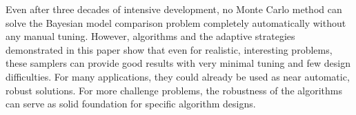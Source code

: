 Even after three decades of intensive development, no Monte Carlo method can
solve the Bayesian model comparison problem completely automatically without
any manual tuning. However, \smc algorithms and the adaptive strategies
demonstrated in this paper show that even for realistic, interesting problems,
these samplers can provide good results with very minimal tuning and few
design difficulties. For many applications, they could already be used as near
automatic, robust solutions. For more challenge problems, the robustness of
the algorithms can serve as solid foundation for specific algorithm designs.
